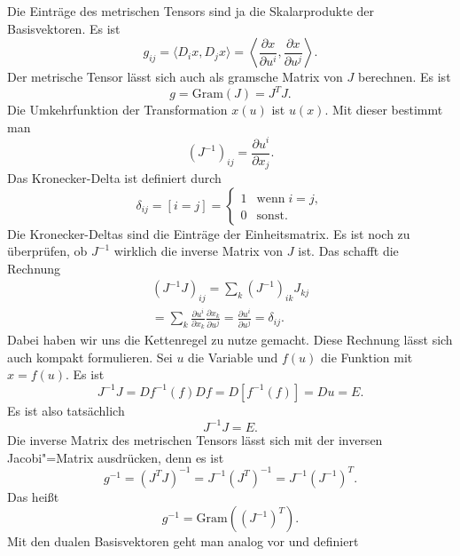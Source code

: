 \documentclass[a4paper,10pt,fleqn,twocolumn,twoside]{article}
\numberwithin{equation}{section}
\begin{document}
Die Einträge des metrischen Tensors sind ja die Skalarprodukte der
Basisvektoren. Es ist
\begin{equation}
g_{ij} = \langle D_i x, D_j x\rangle
=  \left\langle \frac{\partial x}{\partial u^i},
\frac{\partial x}{\partial u^j}\right\rangle.
\end{equation}
Der metrische Tensor lässt sich auch als gramsche Matrix von $J$
berechnen. Es ist
\begin{equation}
g = \mathrm{Gram}(J) = J^T\!J.
\end{equation}
Die Umkehrfunktion der Transformation $x(u)$ ist $u(x)$.
Mit dieser bestimmt man
\begin{equation}
(J^{-1})_{ij} = \frac{\partial u^i}{\partial x_j}.
\end{equation}
Das Kronecker-Delta ist definiert durch
\begin{equation}
\delta_{ij} = [i=j]
= \begin{cases}
1 & \mathrm{wenn}\;i=j,\\
0 & \mathrm{sonst}.
\end{cases}
\end{equation}
Die Kronecker-Deltas sind die Einträge der Einheitsmatrix.
Es ist noch zu überprüfen, ob $J^{-1}$ wirklich die inverse Matrix
von $J$ ist. Das schafft die Rechnung
\begin{gather*}
(J^{-1}J)_{ij} = \sum_{k}(J^{-1})_{ik}J_{kj}\\
= \sum_{k} \frac{\partial u^i}{\partial x_k}
\frac{\partial x_k}{\partial u^j}
= \frac{\partial u^i}{\partial u^j}
= \delta_{ij}.
\end{gather*}
Dabei haben wir uns die Kettenregel zu nutze gemacht. Diese Rechnung
lässt sich auch kompakt formulieren. Sei $u$ die Variable und
$f(u)$ die Funktion mit $x=f(u)$. Es ist
\begin{equation}
J^{-1}J = Df^{-1}(f)Df = D[f^{-1}(f)] = Du = E.
\end{equation}
Es ist also tatsächlich
\begin{equation}
J^{-1}J = E.
\end{equation}
Die inverse Matrix des metrischen Tensors lässt sich mit der inversen
Jacobi"=Matrix ausdrücken, denn es ist
\begin{equation}
g^{-1} = (J^T\!J)^{-1} = J^{-1}(J^T)^{-1} = J^{-1}(J^{-1})^T.
\end{equation}
Das heißt
\begin{equation}
g^{-1} = \mathrm{Gram}((J^{-1})^T).
\end{equation}
%
Mit den dualen Basisvektoren geht man analog vor und definiert
\end{document}
